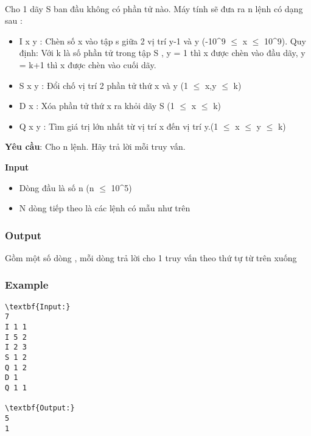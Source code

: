 

 

Cho 1 dãy S ban đầu không có phần tử nào. Máy tính sẽ đưa ra n lệnh có dạng sau :
\begin{itemize}
	\item I x y : Chèn số x vào tập s giữa 2 vị trí y-1 và y (-10^9  $\le$  x  $\le$  10^9). Quy định: Với k là số phần tử trong tập S , y = 1 thì x được chèn vào đầu dãy, y = k+1 thì x được chèn vào cuối dãy.
	\item S x y : Đổi chố vị trí 2 phần tử thứ x và y (1 $\le$  x,y  $\le$  k)
	\item D x : Xóa phần tử thứ x ra khỏi dãy S (1 $\le$ x $\le$ k)
	\item Q x y : Tìm giá trị lớn nhất từ vị trí x đến vị trí y.(1 $\le$ x $\le$ y $\le$ k)
\end{itemize}

\textbf{Yêu cầu}: Cho n lệnh. Hãy trả lời mỗi truy vấn.

\textbf{Input}
\begin{itemize}
	\item Dòng đầu là số n (n  $\le$  10^5)
	\item N dòng tiếp theo là các lệnh có mẫu như trên
\end{itemize}

\subsubsection{Output}

Gồm một số dòng , mỗi dòng trả lời cho 1 truy vấn theo thứ tự từ trên xuống

\subsubsection{Example}
\begin{verbatim}
\textbf{Input:}
7
I 1 1
I 5 2
I 2 3
S 1 2
Q 1 2
D 1
Q 1 1

\textbf{Output:}
5
1\end{verbatim}
